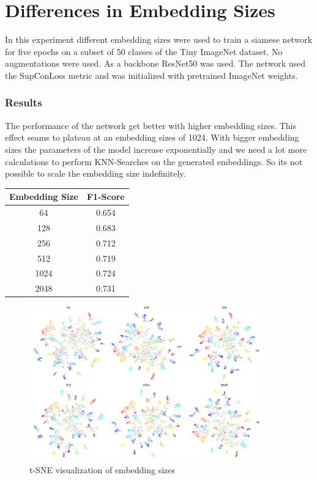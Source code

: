 \documentclass[12pt,a4paper]{report}
\newcommand{\splitlayout}[2]{
	\begin{minipage}{0.6\textwidth}
		#1
	\end{minipage}
	\hfill
	\begin{minipage}{0.35\textwidth}
		#2
	\end{minipage}	
}
\begin{document}
\newpage

\section{Differences in Embedding Sizes}

In this experiment different embedding sizes were used to train a siamese network for five epochs on a subset of 50 classes of the Tiny ImageNet dataset.
No augmentations were used.
As a backbone ResNet50 was used.
The network used the SupConLoss metric and was initialized with pretrained ImageNet weights.


\subsubsection{Results}
\splitlayout{
	The performance of the network get better with higher embedding sizes.
	This effect seams to plateau at an embedding sizes of 1024.
	With bigger embedding sizes the parameters of the model increase exponentially and we need a lot more calculations to perform KNN-Searches on the generated embeddings.
	So its not possible to scale the embedding size indefinitely.
}{
	\begin{tabular}{ | c | c | }
		\hline
		Embedding Size &  F1-Score \\ 
		\hline
		64 &  0.654 \\ 
		\hline
		128 & 0.683 \\ 
		\hline
		256 & 0.712 \\ 
		\hline
		512 & 0.719 \\ 
		\hline
		1024 & 0.724  \\ 
		\hline
		2048 & 0.731 \\ 
		\hline
	\end{tabular}
}

\begin{figure}[hb]
	\centering
	\includegraphics[width=0.9\textwidth]{../plots/embedding_size.png}
	\caption{t-SNE visualization of embedding sizes}
\end{figure}
\end{document}
